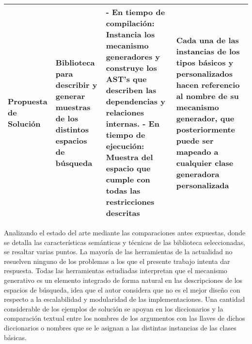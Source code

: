 \begin{longtable}{  p{2.5cm}  p{4cm}  p{6.8cm}  p{6.5cm} }
    \hline
    \rowcolor{lavender}
    Propuesta de Solución                                                                                                                                                                                                                                                                                                                                         &
    Biblioteca para describir y generar muestras de los distintos espacios de búsqueda                                                                                                                                                                                                                                                                            &
    - En tiempo de compilación: Instancia los mecanismo generadores y construye los AST's que describen las dependencias y relaciones internas. \newline- En tiempo de ejecución: Muestra del espacio que cumple con todas las restricciones descritas                                                                                                            &
    Cada una de las instancias de los tipos básicos y personalizados hacen referencio al nombre de su mecanismo generador, que posteriormente puede ser mapeado a cualquier clase generadora personalizada                                                                                                                                                          \\
    \hline
\end{longtable}





Analizando el estado del arte mediante las comparaciones antes expuestas,
donde se detalla las características semánticas y técnicas de las biblioteca
seleccionadas, se resaltar varias puntos. La mayoría de las herramientas de la
actualidad no resuelven ninguno de los problemas a los que el presente trabajo
intenta dar respuesta. Todas las herramientas estudiadas interpretan que el
mecanismo generativo es un elemento integrado de forma natural en las descripciones
de los espacios de búsqueda, idea que el autor considera que no es el mejor
diseño con respecto a la escalabilidad y modularidad de las implementaciones.
Una cantidad considerable de los ejemplos de solución se apoyan en los diccionarios
y la comparación textual entre los nombres de los argumentos con las llaves
de dichos diccionarios o nombres que se le asignan a las distintas instancias de
las clases básicas.

